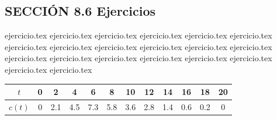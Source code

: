 
\subsection*{SECCIÓN 8.6 \quad Ejercicios}

\begin{enumerate}
    {ejercicio.tex}
{ejercicio.tex}
{ejercicio.tex}
{ejercicio.tex}
{ejercicio.tex}
{ejercicio.tex}
{ejercicio.tex}
{ejercicio.tex}
{ejercicio.tex}
{ejercicio.tex}
{ejercicio.tex}
{ejercicio.tex}
{ejercicio.tex}
{ejercicio.tex}
{ejercicio.tex}
{ejercicio.tex}
{ejercicio.tex}
{ejercicio.tex}
{ejercicio.tex}
{ejercicio.tex}
\vspace{0.3cm}
    \begin{center}
    \begin{tabular}{|c|c|c|c|c|c|c|c|c|c|c|c|}
    \hline
    $t$ & 0 & 2 & 4 & 6 & 8 & 10 & 12 & 14 & 16 & 18 & 20 \\ \hline
    $c(t)$ & 0 & 2.1 & 4.5 & 7.3 & 5.8 & 3.6 & 2.8 & 1.4 & 0.6 & 0.2 & 0 \\ \hline
    \end{tabular}
    \end{center}

\end{enumerate}
